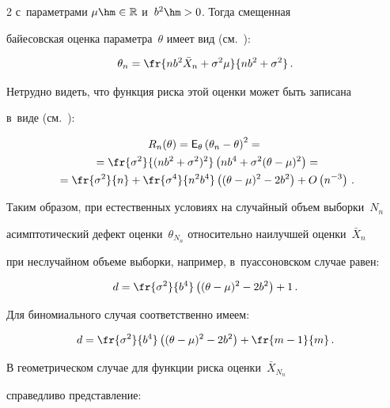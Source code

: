 \begin{multicols}{2}
с~параметрами $\mu\hm \in \mathbb{R}$ и~$b^2 \hm> 0$. Тогда смещенная 


байесовская оценка параметра~$\theta$ имеет вид (см.~\cite[с.~222]{4-ben}):


$$


\theta_n = \fr{nb^2\bar X_n + \sigma^2\mu}{nb^2 + \sigma^2}\,.


$$


Нетрудно видеть, что функция риска этой оценки может быть записана 


в~виде (см.~\cite[формулы~(6.2) и~(6.3)]{1-ben}): 


\begin{multline*}


R_{n}(\theta) = {\sf E}_\theta \left(\theta_n - \theta\right)^2 ={}\\


{}=


\fr{\sigma^2}{(nb^2 + \sigma^2)^2} \left(nb^4 +\sigma^2(\theta - \mu)^2\right) =


\\


{}= \fr{\sigma^2}{n} + \fr{\sigma^4}{n^2b^4}


 \left((\theta - \mu)^2 - 2b^2\right)


+  O\left(n^{-3}\right)\,.


\end{multline*}


Таким образом, при естественных условиях на случайный объем выборки~$N_n$ 


асимптотический \mbox{дефект} оценки~$\theta_{N_n}$ относительно наилучшей оценки~$\bar X_n$ 


при неслучайном объеме выборки, например, в~пуассоновском случае равен:


$$


d = \fr{\sigma^2}{b^4} \left((\theta - \mu)^2 - 2b^2\right) + 1\,.


$$


Для биномиального случая соответственно имеем:


$$


d = \fr{\sigma^2}{b^4} \left((\theta - \mu)^2 - 2b^2\right) + \fr{m - 1}{m}\,.


$$


В геометрическом случае для функции риска оценки~$\bar X_{N_n}$ 


справедливо представление:


\begin{multline*}



\end{multline*}
\end{multicols}
